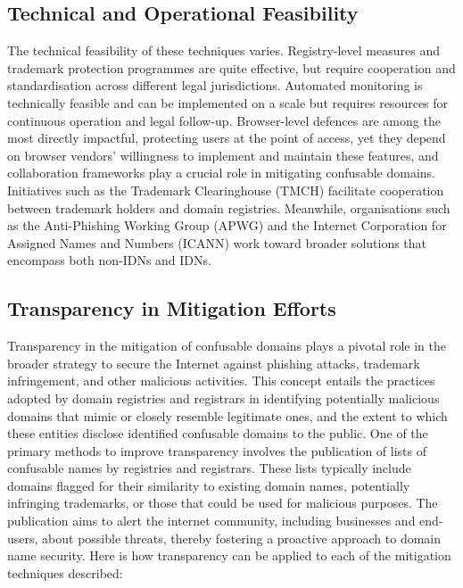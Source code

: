 \subsection{Technical and Operational Feasibility}
The technical feasibility of these techniques varies. Registry-level measures and trademark protection programmes are quite effective, but require cooperation and standardisation across different legal jurisdictions. Automated monitoring is technically feasible and can be implemented on a scale but requires resources for continuous operation and legal follow-up. Browser-level defences are among the most directly impactful, protecting users at the point of access, yet they depend on browser vendors' willingness to implement and maintain these features, and collaboration frameworks play a crucial role in mitigating confusable domains. Initiatives such as the Trademark Clearinghouse (TMCH) facilitate cooperation between trademark holders and domain registries. Meanwhile, organisations such as the Anti-Phishing Working Group (APWG) and the Internet Corporation for Assigned Names and Numbers (ICANN) work toward broader solutions that encompass both non-IDNs and IDNs.

\subsection{ Transparency in Mitigation Efforts}

Transparency in the mitigation of confusable domains plays a pivotal role in the broader strategy to secure the Internet against phishing attacks, trademark infringement, and other malicious activities. This concept entails the practices adopted by domain registries and registrars in identifying potentially malicious domains that mimic or closely resemble legitimate ones, and the extent to which these entities disclose identified confusable domains to the public. One of the primary methods to improve transparency involves the publication of lists of confusable names by registries and registrars. These lists typically include domains flagged for their similarity to existing domain names, potentially infringing trademarks, or those that could be used for malicious purposes. The publication aims to alert the internet community, including businesses and end-users, about possible threats, thereby fostering a proactive approach to domain name security. Here is how transparency can be applied to each of the mitigation techniques described:

